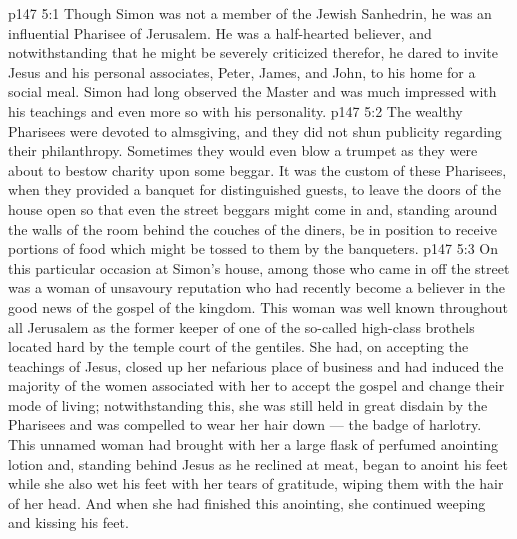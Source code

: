 \vs p147 5:1 Though Simon was not a member of the Jewish Sanhedrin, he was an influential Pharisee of Jerusalem. He was a half\hyp{}hearted believer, and notwithstanding that he might be severely criticized therefor, he dared to invite Jesus and his personal associates, Peter, James, and John, to his home for a social meal. Simon had long observed the Master and was much impressed with his teachings and even more so with his personality.
\vs p147 5:2 The wealthy Pharisees were devoted to almsgiving, and they did not shun publicity regarding their philanthropy. Sometimes they would even blow a trumpet as they were about to bestow charity upon some beggar. It was the custom of these Pharisees, when they provided a banquet for distinguished guests, to leave the doors of the house open so that even the street beggars might come in and, standing around the walls of the room behind the couches of the diners, be in position to receive portions of food which might be tossed to them by the banqueters.
\vs p147 5:3 On this particular occasion at Simon’s house, among those who came in off the street was a woman of unsavoury reputation who had recently become a believer in the good news of the gospel of the kingdom. This woman was well known throughout all Jerusalem as the former keeper of one of the so\hyp{}called high\hyp{}class brothels located hard by the temple court of the gentiles. She had, on accepting the teachings of Jesus, closed up her nefarious place of business and had induced the majority of the women associated with her to accept the gospel and change their mode of living; notwithstanding this, she was still held in great disdain by the Pharisees and was compelled to wear her hair down --- the badge of harlotry. This unnamed woman had brought with her a large flask of perfumed anointing lotion and, standing behind Jesus as he reclined at meat, began to anoint his feet while she also wet his feet with her tears of gratitude, wiping them with the hair of her head. And when she had finished this anointing, she continued weeping and kissing his feet.
